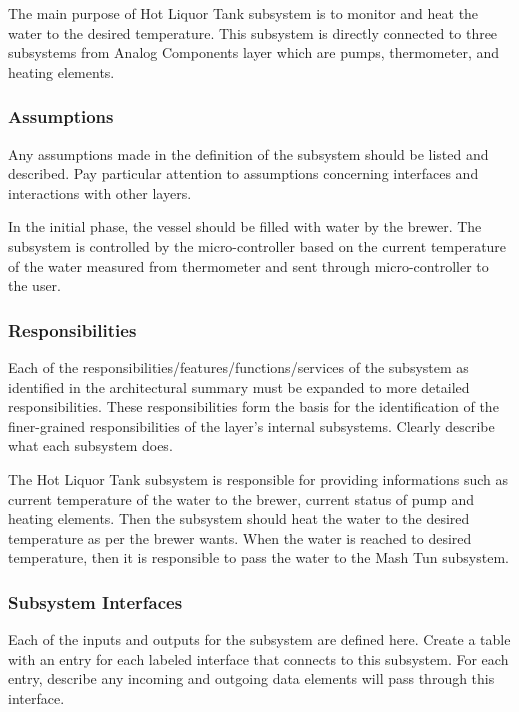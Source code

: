 The main purpose of Hot Liquor Tank subsystem is to monitor and heat the water to the desired temperature. This subsystem is directly connected to three subsystems from Analog Components layer which are pumps, thermometer, and heating elements.

\subsubsection{Assumptions}
Any assumptions made in the definition of the subsystem should be listed and described. Pay particular attention to assumptions concerning interfaces and interactions with other layers.

In the initial phase, the vessel should be filled with water by the brewer. The subsystem is controlled by the micro-controller based on the current temperature of the water measured from thermometer and sent through micro-controller to the user.

\subsubsection{Responsibilities}
Each of the responsibilities/features/functions/services of the subsystem as identified in the architectural summary must be expanded to more detailed responsibilities. These responsibilities form the basis for the identification of the finer-grained responsibilities of the layer's internal subsystems. Clearly describe what each subsystem does.

The Hot Liquor Tank subsystem is responsible for providing informations such as current temperature of the water to the brewer, current status of pump and heating elements. Then the subsystem should heat the water to the desired temperature as per the brewer wants. When the water is reached to desired temperature, then it is responsible to pass the water to the Mash Tun subsystem.

\subsubsection{Subsystem Interfaces}
Each of the inputs and outputs for the subsystem are defined here. Create a table with an entry for each labeled interface that connects to this subsystem. For each entry, describe any incoming and outgoing data elements will pass through this interface.

